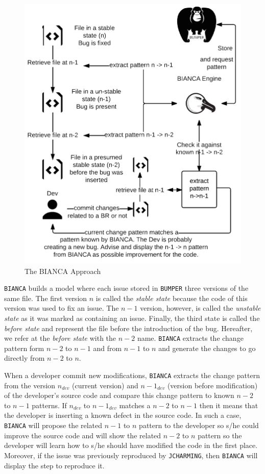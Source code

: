 \begin{figure}[h!]
  \centering
    \includegraphics{media/bianca-approach.png}
    \caption{The BIANCA Approach
    \label{fig:bianca-approach}}
\end{figure}

{\tt BIANCA} builds a model where each issue stored in {\tt BUMPER} three versions of the same file.
The first version $n$ is called the {\it stable state} because the code of this version was used to fix an issue.
The $n-1$ version, however, is called the {\it unstable state} as it was marked as containing an issue.
Finally, the third state is called the {\it before state} and represent the file before the introduction of the bug.
Hereafter, we refer at the {\it before state} with the $n-2$ name.
{\tt BIANCA} extracts the change pattern form $n-2$ to $n-1$ and from $n-1$ to $n$ and generate the changes to go directly from $n-2$ to $n$.

When a developer commit new modifications, {\tt BIANCA} extracts the change pattern from the version $n_{dev}$ (current version) and $n-1_{dev}$ (version before modification) of the developer's source code and compare this change pattern to known $n-2$ to $n-1$ patterns.
If $n_{dev}$ to $n-1_{dev}$ matches a $n-2$ to $n-1$ then it means that the developer is inserting a known defect in the source code.
In such a case, {\tt BIANCA} will propose the related $n-1$ to $n$ pattern to the developer so s/he could improve the source code and will show the related $n-2$ to $n$ pattern so the developer will learn how to s/he should have modified the code in the first place. Moreover, if the issue was previously reproduced by {\tt JCHARMING}, then {\tt BIANCA} will display the step to reproduce it.

